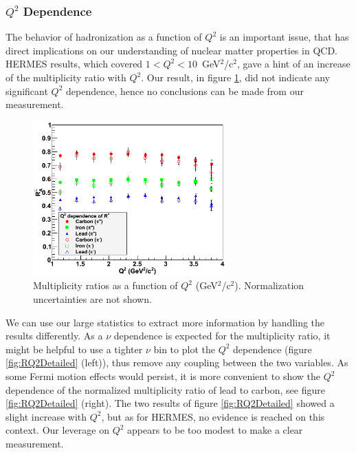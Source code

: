 \subsubsection{$Q^2$ Dependence}

The behavior of hadronization as a function of $Q^2$ is an important issue, that 
has direct implications on our understanding of nuclear matter properties in 
QCD. HERMES results, which covered $1<Q^2<10$~GeV$^2$/c$^2$, gave a hint of an 
increase of the multiplicity ratio with $Q^2$. Our result, in figure 
\ref{fig:RQ2}, did not indicate any significant $Q^2$ dependence, hence no conclusions can be made from our measurement.

\begin{figure}[tbp]
\centering
\includegraphics[width=7.4cm] {chap6-fig/F_RvQ2.png} 
\caption {Multiplicity ratios as a function of $Q^2$ (GeV$^2$/c$^2$). 
Normalization uncertainties are not shown.}
\label{fig:RQ2}
\end{figure}

We can use our large statistics to extract more information by handling the results differently. As a $\nu$ dependence is expected for the multiplicity ratio, it might be helpful to use a tighter $\nu$ bin to plot the $Q^2$ dependence (figure \ref{fig:RQ2Detailed} (left)), thus remove any coupling between the two variables.
As some Fermi motion effects would persist, it is more convenient to show the $Q^2$ dependence of the normalized multiplicity ratio of lead to carbon, see figure \ref{fig:RQ2Detailed} (right). The two results of figure \ref{fig:RQ2Detailed} 
showed a slight increase with $Q^2$, but as for HERMES, no evidence is 
reached on this context. Our leverage on $Q^2$ appears to be too modest to make a clear measurement. 

